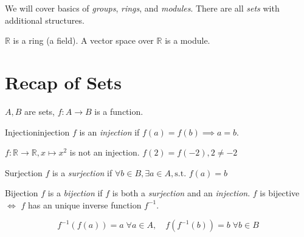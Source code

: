 

\date{}
\title{}



\maketitle





We will cover basics of \emph{groups}, \emph{rings}, and \emph{modules}. There are all \emph{sets} with additional structures.

\begin{Example}{}{}
  $\mathbb{R}$ is a ring (a field). A vector space over $\mathbb{R}$ is a module.
\end{Example}

\section{Recap of Sets}

$A, B$ are sets, $f: A \to B$ is a function.

\begin{Definition}{Injection}{injection}
  $f$ is an \emph{injection} if $f(a) = f(b) \implies a = b$. 
\end{Definition}

\begin{Example}{}{}
  $f: \mathbb{R} \to \mathbb{R}, x \mapsto x^2$ is not an injection. $f(2) = f(-2), 2 \neq -2$ 
\end{Example}

\begin{Definition}{Surjection}{}
  $f$ is a \emph{surjection} if $\forall b \in B, \exists a \in A, \text{s.t. } f(a) = b$
\end{Definition}

\begin{Definition}{Bijection}{}
  $f$ is a \emph{bijection} if $f$ is both a \emph{surjection} and an \emph{injection}. 
  $f$ is bijective $\iff$ $f$ has an unique inverse function $f^{-1}$. 

  $$
  f^{-1}(f(a)) = a \; \forall a \in A, \quad f(f^{-1}(b)) = b \; \forall b \in B
  $$
\end{Definition}

